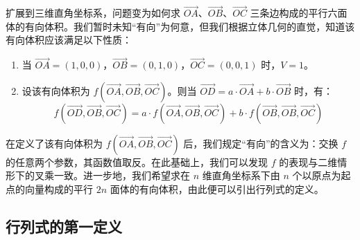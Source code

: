 扩展到三维直角坐标系，问题变为如何求 $\overset{\longrightarrow}{OA}$、$\overset{\longrightarrow}{OB}$、$\overset{\longrightarrow}{OC}$ 三条边构成的平行六面体的有向体积。我们暂时未知“有向”为何意，但我们根据立体几何的直觉，知道该有向体积应该满足以下性质：
\begin{enumerate}
	\item 当 $\overset{\longrightarrow}{OA} = (1, 0, 0)$，$\overset{\longrightarrow}{OB} = (0, 1, 0)$，$\overset{\longrightarrow}{OC} = (0, 0, 1)$ 时，$V = 1$。
	\item 设该有向体积为 $f(\overset{\longrightarrow}{OA}, \overset{\longrightarrow}{OB}, \overset{\longrightarrow}{OC})$。则当 $\overset{\longrightarrow}{OD} = a \cdot \overset{\longrightarrow}{OA} + b \cdot \overset{\longrightarrow}{OB}$ 时，有：
	$$
	f(\overset{\longrightarrow}{OD}, \overset{\longrightarrow}{OB}, \overset{\longrightarrow}{OC}) = a \cdot f(\overset{\longrightarrow}{OA}, \overset{\longrightarrow}{OB}, \overset{\longrightarrow}{OC}) + b \cdot f(\overset{\longrightarrow}{OB}, \overset{\longrightarrow}{OB}, \overset{\longrightarrow}{OC})
	$$
\end{enumerate}

在定义了该有向体积为 $f(\overset{\longrightarrow}{OA}, \overset{\longrightarrow}{OB}, \overset{\longrightarrow}{OC})$ 后，我们规定“有向”的含义为：交换 $f$ 的任意两个参数，其函数值取反。在此基础上，我们可以发现 $f$ 的表现与二维情形下的叉乘一致。进一步地，我们希望求在 $n$ 维直角坐标系下由 $n$ 个以原点为起点的向量构成的平行 $2n$ 面体的有向体积，由此便可以引出行列式的定义。

\subsection{行列式的第一定义}

